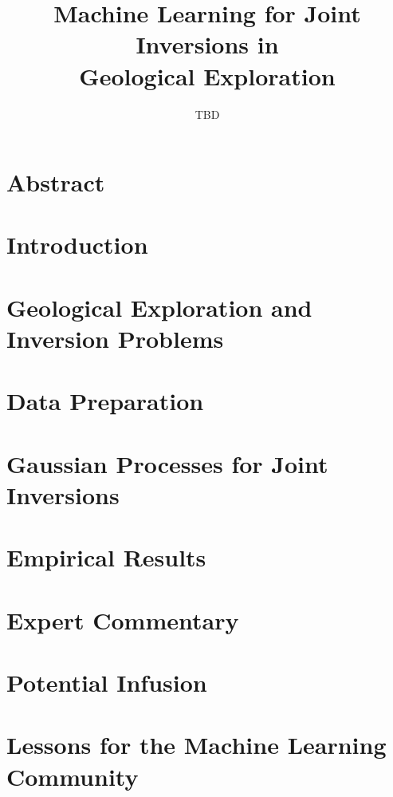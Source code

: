 \documentclass[11pt,a4paper]{article}
\title{Machine Learning for Joint Inversions in \\Geological Exploration}
\author{TBD}
\begin{document}
\maketitle


\section*{Abstract}


\section{Introduction}



\section{Geological Exploration and Inversion Problems}



\section{Data Preparation}



\section{Gaussian Processes for Joint Inversions}



\section{Empirical Results}



\section{Expert Commentary}



\section{Potential Infusion}



\section{Lessons for the Machine Learning Community}





\end{document}
